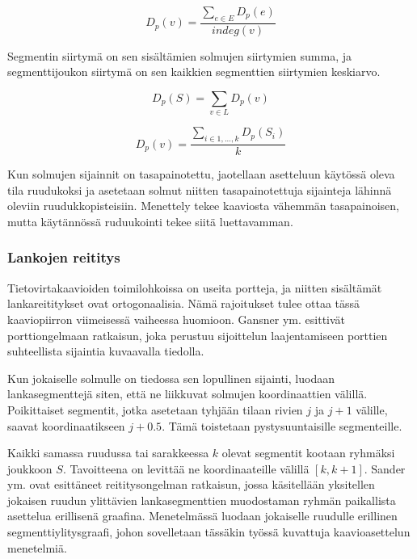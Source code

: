 \documentclass[finnish,12pt]{article}
\begin{document}
 \begin{equation}
 	D_p(v)=\frac{\sum_{e \in E}D_p(e)}{indeg(v)}
\end{equation}

Segmentin siirtymä on sen sisältämien solmujen siirtymien summa, ja segmenttijoukon siirtymä on sen kaikkien segmenttien siirtymien keskiarvo.

\begin{equation}
	D_p(S)=\sum_{v \in L} D_p(v)
\end{equation}

\begin{equation}
	D_p(v)=\frac{\sum_{i \in {1,...,k}}D_p(S_i)}{k}
\end{equation}


Kun solmujen sijainnit on tasapainotettu, jaotellaan asetteluun käytössä oleva tila ruudukoksi ja asetetaan solmut niitten tasapainotettuja sijainteja lähinnä oleviin ruudukkopisteisiin.
Menettely tekee kaaviosta vähemmän tasapainoisen, mutta käytännössä ruduukointi tekee siitä luettavamman.

		\subsubsection{Lankojen reititys}

Tietovirtakaavioiden toimilohkoissa on useita portteja, ja niitten sisältämät lankareititykset ovat ortogonaalisia.
Nämä rajoitukset tulee ottaa tässä kaaviopiirron viimeisessä vaiheessa huomioon.
Gansner ym. esittivät porttiongelmaan ratkaisun, joka perustuu sijoittelun laajentamiseen porttien suhteellista sijaintia kuvaavalla tiedolla. \cite{RefWorks:28}

Kun jokaiselle solmulle on tiedossa sen lopullinen sijainti, luodaan lankasegmenttejä siten, että ne liikkuvat solmujen koordinaattien välillä.
Poikittaiset segmentit, jotka asetetaan tyhjään tilaan rivien $j$ ja $j+1$ välille, saavat koordinaatikseen $j+0.5$.
Tämä toistetaan pystysuuntaisille segmenteille.

Kaikki samassa ruudussa tai sarakkeessa $k$ olevat segmentit kootaan ryhmäksi joukkoon $S$.
Tavoitteena on levittää ne koordinaateille välillä $[k, k+1]$.
Sander ym. ovat esittäneet reititysongelman ratkaisun, jossa käsitellään yksitellen jokaisen ruudun ylittävien lankasegmenttien muodostaman ryhmän paikallista asettelua erillisenä graafina. \cite{RefWorks:17}
Menetelmässä luodaan jokaiselle ruudulle erillinen segmenttiylitysgraafi, johon sovelletaan tässäkin työssä kuvattuja kaavioasettelun menetelmiä.
\end{document}
